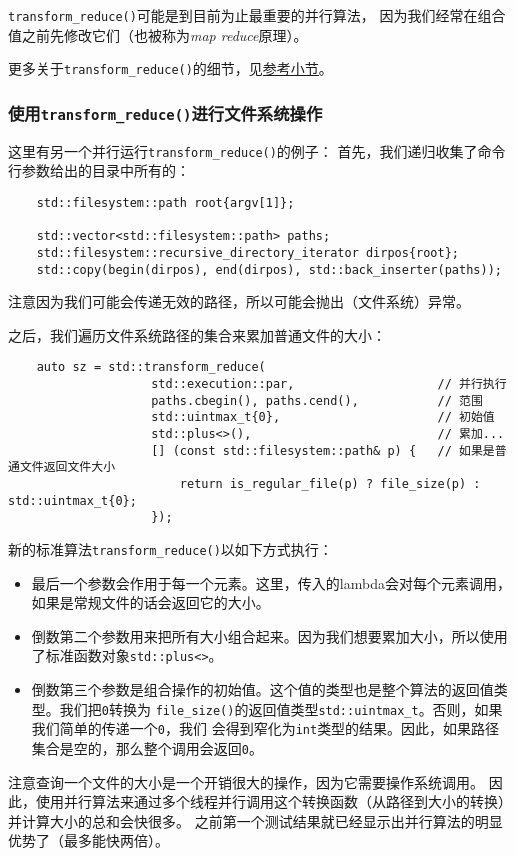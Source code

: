 \texttt{transform\_reduce()}可能是到目前为止最重要的并行算法，
因为我们经常在组合值之前先修改它们（也被称为\emph{map reduce}原理）。

更多关于\texttt{transform\_reduce()}的细节，见\hyperref[ch23.2.2]{参考小节}。

\subsubsection{使用\texttt{transform\_reduce()}进行文件系统操作}\label{ch22.6.1.4}
这里有另一个并行运行\texttt{transform\_reduce()}的例子：
首先，我们递归收集了命令行参数给出的目录中所有的：
\begin{lstlisting}
    std::filesystem::path root{argv[1]};

    std::vector<std::filesystem::path> paths;
    std::filesystem::recursive_directory_iterator dirpos{root};
    std::copy(begin(dirpos), end(dirpos), std::back_inserter(paths));
\end{lstlisting}
注意因为我们可能会传递无效的路径，所以可能会抛出（文件系统）异常。

之后，我们遍历文件系统路径的集合来累加普通文件的大小：
\begin{lstlisting}
    auto sz = std::transform_reduce(
                    std::execution::par,                    // 并行执行
                    paths.cbegin(), paths.cend(),           // 范围
                    std::uintmax_t{0},                      // 初始值
                    std::plus<>(),                          // 累加...
                    [] (const std::filesystem::path& p) {   // 如果是普通文件返回文件大小
                        return is_regular_file(p) ? file_size(p) : std::uintmax_t{0};
                    });
\end{lstlisting}
新的标准算法\texttt{transform\_reduce()}以如下方式执行：
\begin{itemize}
    \item 最后一个参数会作用于每一个元素。这里，传入的lambda会对每个元素调用，
    如果是常规文件的话会返回它的大小。
    \item 倒数第二个参数用来把所有大小组合起来。因为我们想要累加大小，所以使用了标准函数对象\texttt{std::plus<>}。
    \item 倒数第三个参数是组合操作的初始值。这个值的类型也是整个算法的返回值类型。我们把\texttt{0}转换为
    \texttt{file\_size()}的返回值类型\texttt{std::uintmax\_t}。否则，如果我们简单的传递一个\texttt{0}，我们
    会得到窄化为\texttt{int}类型的结果。因此，如果路径集合是空的，那么整个调用会返回\texttt{0}。
\end{itemize}
注意查询一个文件的大小是一个开销很大的操作，因为它需要操作系统调用。
因此，使用并行算法来通过多个线程并行调用这个转换函数（从路径到大小的转换）并计算大小的总和会快很多。
之前第一个测试结果就已经显示出并行算法的明显优势了（最多能快两倍）。

